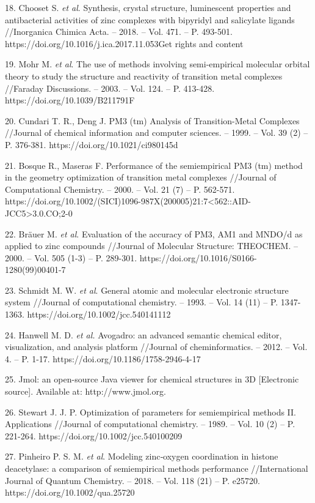 \begin{noparindent}
18.
  Chooset S. \emph{et al}. Synthesis, crystal structure, luminescent
  properties and antibacterial activities of zinc complexes with
  bipyridyl and salicylate ligands //Inorganica Chimica Acta. -- 2018.
  -- Vol. 471. -- P. 493-501.
  https://doi.org/10.1016/j.ica.2017.11.053Get rights and content

19.
  Mohr M. \emph{et al}. The use of methods involving semi-empirical
  molecular orbital theory to study the structure and reactivity of
  transition metal complexes //Faraday Discussions. -- 2003. -- Vol.
  124. -- P. 413-428. https://doi.org/10.1039/B211791F

20.
  Cundari T. R., Deng J. PM3 (tm) Analysis of Transition-Metal Complexes
  //Journal of chemical information and computer sciences. -- 1999. --
  Vol. 39 (2) -- P. 376-381. https://doi.org/10.1021/ci980145d

21.
  Bosque R., Maseras F. Performance of the semiempirical PM3 (tm) method
  in the geometry optimization of transition metal complexes //Journal
  of Computational Chemistry. -- 2000. -- Vol. 21 (7) -- P. 562-571.
  https://doi.org/10.1002/(SICI)1096-987X(200005)21:7\textless562::AID-JCC5\textgreater3.0.CO;2-0

22.
  Bräuer M. \emph{et al}. Evaluation of the accuracy of PM3, AM1 and
  MNDO/d as applied to zinc compounds //Journal of Molecular Structure:
  THEOCHEM. -- 2000. -- Vol. 505 (1-3) -- P. 289-301.
  https://doi.org/10.1016/S0166-1280(99)00401-7

23.
  Schmidt M. W. \emph{et al}. General atomic and molecular electronic
  structure system //Journal of computational chemistry. -- 1993. --
  Vol. 14 (11) -- P. 1347-1363. https://doi.org/10.1002/jcc.540141112

24.
  Hanwell M. D. \emph{et al.} Avogadro: an advanced semantic chemical
  editor, visualization, and analysis platform //Journal of
  cheminformatics. -- 2012. -- Vol. 4. -- P. 1-17.
  https://doi.org/10.1186/1758-2946-4-17

25.
  Jmol: an open-source Java viewer for chemical structures in 3D
  {[}Electronic source{]}. Available at: http://www.jmol.org.

26.
  Stewart J. J. P. Optimization of parameters for semiempirical methods
  II. Applications //Journal of computational chemistry. -- 1989. --
  Vol. 10 (2) -- P. 221-264. https://doi.org/10.1002/jcc.540100209

27.
  Pinheiro P. S. M. \emph{et al}. Modeling zinc‐oxygen coordination in
  histone deacetylase: a comparison of semiempirical methods performance
  //International Journal of Quantum Chemistry. -- 2018. -- Vol. 118
  (21) -- P. e25720. https://doi.org/10.1002/qua.25720


\end{noparindent}
